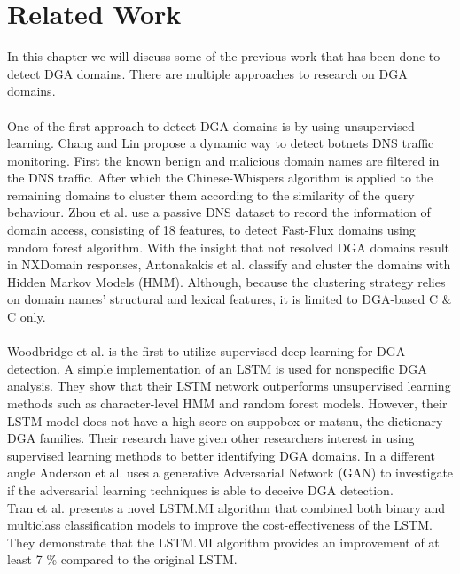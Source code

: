 \chapter{Related Work}\label{relatedwork}
In this chapter we will discuss some of the previous work that has been done to detect DGA domains. There are multiple approaches to research on DGA domains.\\\\
One of the first approach to detect DGA domains is by using unsupervised learning. Chang and Lin \cite{Chang_Lin} propose a dynamic way to detect botnets DNS traffic monitoring. First the known benign and malicious domain names are filtered in the DNS traffic.  After which the Chinese-Whispers algorithm is applied to the remaining domains to cluster them according to the similarity of the query behaviour. 
Zhou et al. \cite{Zhou2013DGABasedBD} use a passive DNS dataset to record the information of domain access, consisting of 18 features, to detect Fast-Flux domains using random forest algorithm. 
With the insight that not resolved DGA domains result in NXDomain responses, Antonakakis et al. \cite{Antonakakis} classify and cluster the domains with Hidden Markov Models (HMM). Although, because the clustering strategy relies on domain names' structural and lexical features, it is limited to DGA-based C \& C only.\\\\ 
Woodbridge et al. \cite{Woodbridge} is the first to utilize supervised deep learning for DGA detection. A simple implementation of an LSTM is used for nonspecific DGA analysis. They show that their LSTM network outperforms unsupervised learning methods such as character-level HMM and random forest models. However, their LSTM model does not have a high score on suppobox or matsnu, the dictionary DGA families. Their research have given other researchers interest in using supervised learning methods to better identifying DGA domains. 
In a different angle Anderson et al. \cite{Anderson} uses a generative Adversarial Network (GAN) to investigate if the adversarial learning techniques is able to deceive DGA detection.
\pagebreak
\\Tran et al. \cite{TRAN20182401} presents a novel LSTM.MI algorithm that combined both binary and multiclass classification models to improve the cost-effectiveness of the LSTM. They demonstrate that the LSTM.MI algorithm provides an improvement of at least 7 \% compared to the original LSTM.
